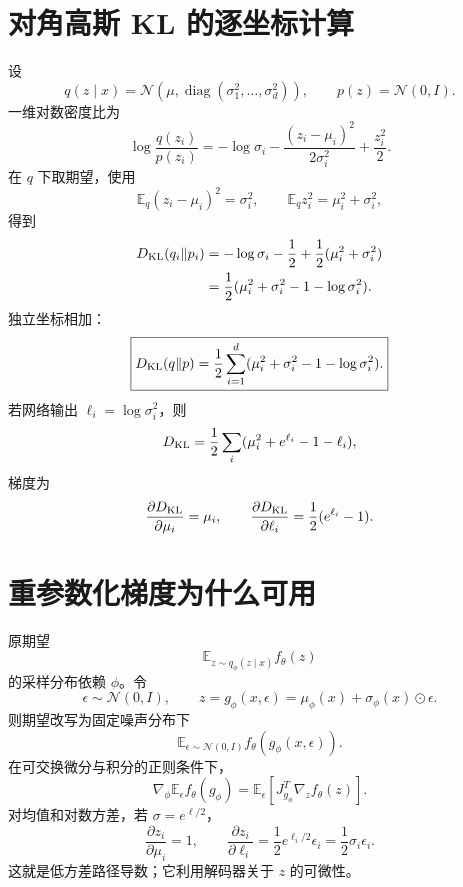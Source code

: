 \documentclass[11pt]{article}
\numberwithin{equation}{section}
\newcommand{\E}{\mathbb{E}}
\newcommand{\1}{\mathbf{1}}
\newcommand{\cN}{\mathcal{N}}
\newcommand{\diag}{\operatorname{diag}}
\begin{document}
\section{对角高斯 KL 的逐坐标计算}

设
\begin{equation}
 q(z\mid x)=\cN(\mu,\diag(\sigma_1^2,\ldots,\sigma_d^2)),
 \qquad p(z)=\cN(0,I).
\end{equation}
一维对数密度比为
\begin{equation}
 \log\frac{q(z_i)}{p(z_i)}
 =-\log\sigma_i-\frac{(z_i-\mu_i)^2}{2\sigma_i^2}
 +\frac{z_i^2}{2}.
\end{equation}
在 $q$ 下取期望，使用
\begin{equation}
 \E_q(z_i-\mu_i)^2=\sigma_i^2,\qquad
 \E_qz_i^2=\mu_i^2+\sigma_i^2,
\end{equation}
得到
\begin{align}
 D_{\rm KL}(q_i\|p_i)
 &=-\log\sigma_i-\frac12+\frac12(\mu_i^2+\sigma_i^2)\\
 &=\frac12(\mu_i^2+\sigma_i^2-1-\log\sigma_i^2).
\end{align}
独立坐标相加：
\begin{equation}
 \boxed{D_{\rm KL}(q\|p)=\frac12\sum_{i=1}^{d}
 (\mu_i^2+\sigma_i^2-1-\log\sigma_i^2).}
\end{equation}
若网络输出 $\ell_i=\log\sigma_i^2$，则
\begin{equation}
 D_{\rm KL}=\frac12\sum_i(\mu_i^2+e^{\ell_i}-1-\ell_i),
\end{equation}
梯度为
\begin{equation}
 \frac{\partial D_{\rm KL}}{\partial\mu_i}=\mu_i,\qquad
 \frac{\partial D_{\rm KL}}{\partial\ell_i}=\frac12(e^{\ell_i}-1).
\end{equation}

\section{重参数化梯度为什么可用}

原期望
\begin{equation}
 \E_{z\sim q_\phi(z\mid x)}f_\theta(z)
\end{equation}
的采样分布依赖 $\phi$。令
\begin{equation}
 \epsilon\sim\cN(0,I),\qquad
 z=g_\phi(x,\epsilon)=\mu_\phi(x)+\sigma_\phi(x)\odot\epsilon.
\end{equation}
则期望改写为固定噪声分布下
\begin{equation}
 \E_{\epsilon\sim\cN(0,I)}f_\theta(g_\phi(x,\epsilon)).
\end{equation}
在可交换微分与积分的正则条件下，
\begin{equation}
 \nabla_\phi\E_\epsilon f_\theta(g_\phi)
 =\E_\epsilon[J_{g_\phi}^T\nabla_zf_\theta(z)].
\end{equation}
对均值和对数方差，若 $\sigma=e^{\ell/2}$，
\begin{equation}
 \frac{\partial z_i}{\partial\mu_i}=1,\qquad
 \frac{\partial z_i}{\partial\ell_i}=\frac12e^{\ell_i/2}\epsilon_i
 =\frac12\sigma_i\epsilon_i.
\end{equation}
这就是低方差路径导数；它利用解码器关于 $z$ 的可微性。
\end{document}
